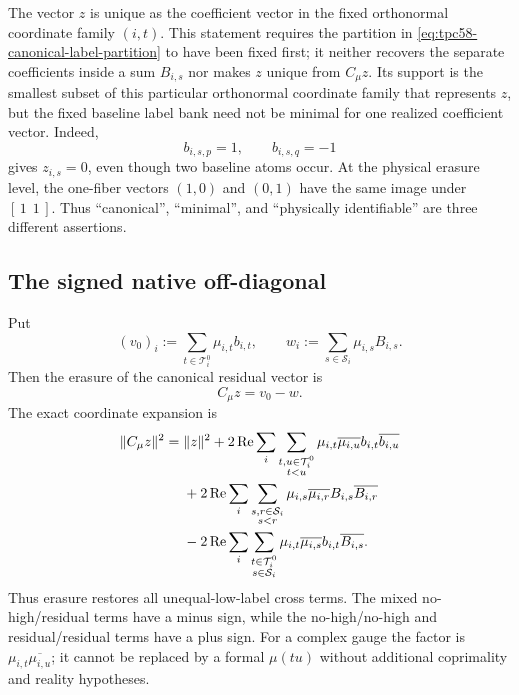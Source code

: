 The vector \(z\) is unique as the coefficient vector in the fixed
orthonormal coordinate family \((i,t)\).  This statement requires the
partition in \eqref{eq:tpc58-canonical-label-partition} to have been fixed
first; it neither recovers the separate coefficients inside a sum
\(B_{i,s}\) nor makes \(z\) unique from \(C_\mu z\).  Its support is the
smallest subset of this particular orthonormal coordinate family that
represents \(z\), but the fixed baseline label bank need not be minimal for
one realized coefficient vector.  Indeed,
\begin{equation}
 b_{i,s,p}=1,
 \qquad b_{i,s,q}=-1
 \label{eq:tpc58-cancelled-residual-counterexample}
\end{equation}
gives \(z_{i,s}=0\), even though two baseline atoms occur.  At the physical
erasure level, the one-fiber vectors \((1,0)\) and \((0,1)\) have the same
image under \([\,1\ \ 1\,]\).  Thus ``canonical'', ``minimal'', and
``physically identifiable'' are three different assertions.

\subsection{The signed native off-diagonal}

Put
\begin{equation}
 (v_0)_i:=\sum_{t\in\mathcal T_i^0}\mu_{i,t}b_{i,t},
 \qquad
 w_i:=\sum_{s\in\mathcal S_i}\mu_{i,s}B_{i,s}.
 \label{eq:tpc58-vzero-and-w}
\end{equation}
Then the erasure of the canonical residual vector is
\begin{equation}
 \boxed{C_\mu z=v_0-w.}
 \label{eq:tpc58-erased-affine-difference}
\end{equation}
The exact coordinate expansion is
\begin{align}
 \|C_\mu z\|^2
 ={}&\|z\|^2
 +2\operatorname{Re}\sum_i
   \sum_{\substack{t,u\in\mathcal T_i^0\\t<u}}
   \mu_{i,t}\overline{\mu_{i,u}}
   b_{i,t}\overline{b_{i,u}}
 \notag\\
 &+2\operatorname{Re}\sum_i
   \sum_{\substack{s,r\in\mathcal S_i\\s<r}}
   \mu_{i,s}\overline{\mu_{i,r}}
   B_{i,s}\overline{B_{i,r}}
 \notag\\
 &-2\operatorname{Re}\sum_i
   \sum_{\substack{t\in\mathcal T_i^0\\s\in\mathcal S_i}}
   \mu_{i,t}\overline{\mu_{i,s}}
   b_{i,t}\overline{B_{i,s}}.
 \label{eq:tpc58-complete-signed-offdiagonal}
\end{align}
Thus erasure restores all unequal-low-label cross terms.  The mixed
no-high/residual terms have a minus sign, while the no-high/no-high and
residual/residual terms have a plus sign.  For a complex gauge the factor is
\(\mu_{i,t}\overline{\mu_{i,u}}\); it cannot be replaced by a formal
\(\mu(tu)\) without additional coprimality and reality hypotheses.


